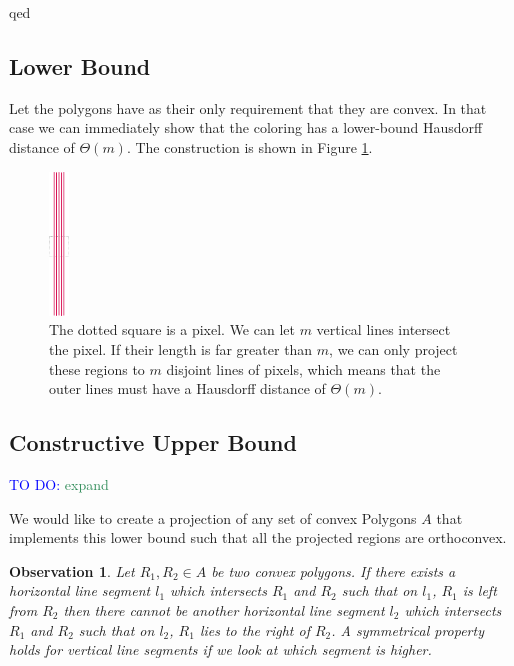 \documentclass[a4paper, UKenglish]{lipics-v2018}
\newtheorem{observation}{Observation}
\newcommand{\mremark}[3]{\textcolor{blue}{\textsc{#1 #2:}} \textcolor{SeaGreen}{\textsf{#3}}}
\newcommand{\todo}[2][DO]{\mremark{TO}{#1}{#2}}
\begin{document}
qed


\subsection{Lower Bound}
\label{sub:convex_lower}

Let the polygons have as their only requirement that they are convex. In that case we can immediately show that the coloring has a lower-bound Hausdorff distance of $\Theta(m)$. The construction is shown in Figure \ref{fig:linesexample}.

\begin{figure}[H]
\centering
\includegraphics[width=20px]{Figures/linesexample.png}
\caption{The dotted square is a pixel. We can let $m$ vertical lines intersect the pixel. If their length is far greater than $m$, we can only project these regions to $m$ disjoint lines of pixels, which means that the outer lines must have a Hausdorff distance of $\Theta(m)$.}
\label{fig:linesexample}
\end{figure}



\subsection{Constructive Upper Bound}
\label{sub:convex_upper}

\todo{expand}

We would like to create a projection of any set of convex Polygons $A$ that implements this lower bound such that all the projected regions are orthoconvex.



\begin{observation}
Let $R_1,R_2 \in A$ be two convex polygons. If there exists a horizontal line segment $l_1$ which intersects $R_1$ and $R_2$ such that on $l_1$, $R_1$ is left from $R_2$ then there cannot be another horizontal line segment $l_2$ which intersects $R_1$ and $R_2$ such that on $l_2$, $R_1$ lies to the right of $R_2$. A symmetrical property holds for vertical line segments if we look at which segment is higher.
\end{observation}
\end{document}

